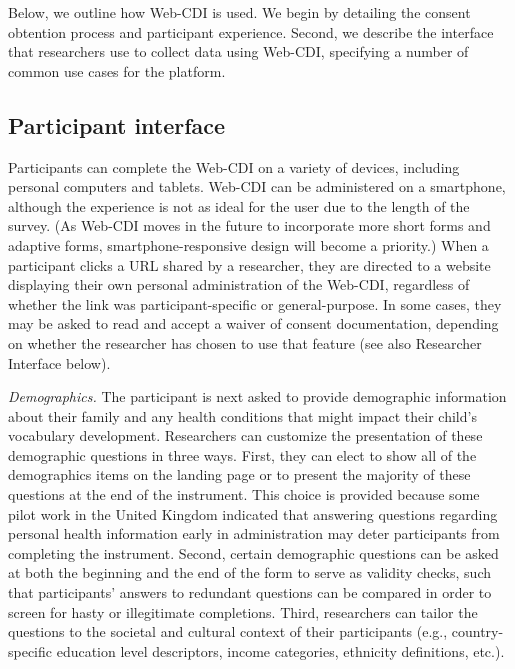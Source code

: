 \documentclass[
  english,
  ,man,floatsintext]{apa6}
\begin{document}
Below, we outline how Web-CDI is used. We begin by detailing the consent obtention process and participant experience. Second, we describe the interface that researchers use to collect data using Web-CDI, specifying a number of common use cases for the platform.

\hypertarget{participant-interface}{%
\subsection{Participant interface}\label{participant-interface}}

Participants can complete the Web-CDI on a variety of devices, including personal computers and tablets. Web-CDI can be administered on a smartphone, although the experience is not as ideal for the user due to the length of the survey. (As Web-CDI moves in the future to incorporate more short forms and adaptive forms, smartphone-responsive design will become a priority.) When a participant clicks a URL shared by a researcher, they are directed to a website displaying their own personal administration of the Web-CDI, regardless of whether the link was participant-specific or general-purpose. In some cases, they may be asked to read and accept a waiver of consent documentation, depending on whether the researcher has chosen to use that feature (see also Researcher Interface below).

\emph{Demographics.} The participant is next asked to provide demographic information about their family and any health conditions that might impact their child's vocabulary development. Researchers can customize the presentation of these demographic questions in three ways. First, they can elect to show all of the demographics items on the landing page or to present the majority of these questions at the end of the instrument. This choice is provided because some pilot work in the United Kingdom indicated that answering questions regarding personal health information early in administration may deter participants from completing the instrument. Second, certain demographic questions can be asked at both the beginning and the end of the form to serve as validity checks, such that participants' answers to redundant questions can be compared in order to screen for hasty or illegitimate completions. Third, researchers can tailor the questions to the societal and cultural context of their participants (e.g., country-specific education level descriptors, income categories, ethnicity definitions, etc.).
\end{document}
